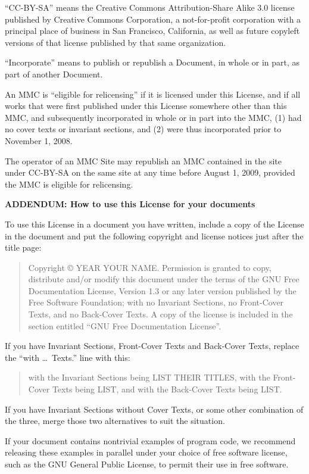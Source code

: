 \documentclass[10pt,a4paper,ngerman,titlepage,tocindentauto]{article}
\begin{document}
\begin{multicols}{3}
{				``CC-BY-SA'' means the Creative Commons Attribution-Share Alike 3.0
				license published by Creative Commons Corporation, a not-for-profit
				corporation with a principal place of business in San Francisco,
				California, as well as future copyleft versions of that license
				published by that same organization.

				``Incorporate'' means to publish or republish a Document, in whole or
				in part, as part of another Document.

				An MMC is ``eligible for relicensing'' if it is licensed under this
				License, and if all works that were first published under this License
				somewhere other than this MMC, and subsequently incorporated in whole
				or in part into the MMC, (1) had no cover texts or invariant sections,
				and (2) were thus incorporated prior to November 1, 2008.

				The operator of an MMC Site may republish an MMC contained in the site
				under CC-BY-SA on the same site at any time before August 1, 2009,
				provided the MMC is eligible for relicensing.


				\begin{center}
				{\bf ADDENDUM: How to use this License for your documents\par}
				\end{center}

				To use this License in a document you have written, include a copy of
				the License in the document and put the following copyright and
				license notices just after the title page:

				\bigskip
				\begin{quote}
					 Copyright \copyright{}  YEAR  YOUR NAME.
					 Permission is granted to copy, distribute and/or modify this document
					 under the terms of the GNU Free Documentation License, Version 1.3
					 or any later version published by the Free Software Foundation;
					 with no Invariant Sections, no Front-Cover Texts, and no Back-Cover Texts.
					 A copy of the license is included in the section entitled ``GNU
					 Free Documentation License''.
				\end{quote}
				\bigskip
					 
				If you have Invariant Sections, Front-Cover Texts and Back-Cover Texts,
				replace the ``with \dots\ Texts.'' line with this:

				\bigskip
				\begin{quote}
					 with the Invariant Sections being LIST THEIR TITLES, with the
					 Front-Cover Texts being LIST, and with the Back-Cover Texts being LIST.
				\end{quote}
				\bigskip
					 
				If you have Invariant Sections without Cover Texts, or some other
				combination of the three, merge those two alternatives to suit the
				situation.

				If your document contains nontrivial examples of program code, we
				recommend releasing these examples in parallel under your choice of
				free software license, such as the GNU General Public License,
				to permit their use in free software.
			}
		\end{multicols}
\end{document}
